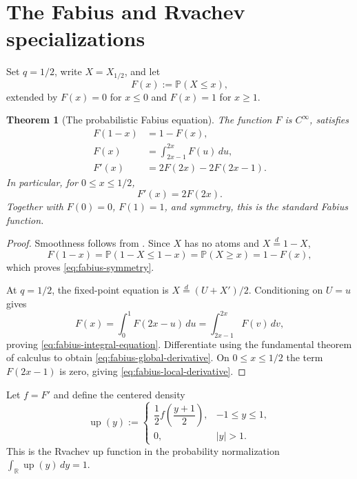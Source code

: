 \documentclass[11pt,oneside,openany]{book}
\newtheorem{theorem}{Theorem}[chapter]
\theoremstyle{definition}
\theoremstyle{remark}
\newcommand{\R}{\mathbb R}
\newcommand{\abs}[1]{\lvert #1\rvert}
\begin{document}
\section{The Fabius and Rvachev specializations}

Set $q=1/2$, write $X=X_{1/2}$, and let
\[
 F(x):=\mathbb P(X\le x),
\]
extended by $F(x)=0$ for $x\le0$ and $F(x)=1$ for $x\ge1$.

\begin{theorem}[The probabilistic Fabius equation]\label{thm:probabilistic-fabius}
The function $F$ is $C^\infty$, satisfies
\begin{align}
 F(1-x)&=1-F(x),\label{eq:fabius-symmetry}\\
 F(x)&=\int_{2x-1}^{2x}F(u)\,du,\label{eq:fabius-integral-equation}\\
 F'(x)&=2F(2x)-2F(2x-1).\label{eq:fabius-global-derivative}
\end{align}
In particular, for $0\le x\le1/2$,
\begin{equation}\label{eq:fabius-local-derivative}
 F'(x)=2F(2x).
\end{equation}
Together with $F(0)=0$, $F(1)=1$, and symmetry, this is the standard Fabius function.
\end{theorem}

\begin{proof}
Smoothness follows from .  Since $X$ has no atoms and $X\overset d=1-X$,
\[
 F(1-x)=\mathbb P(1-X\le1-x)
 =\mathbb P(X\ge x)=1-F(x),
\]
which proves \eqref{eq:fabius-symmetry}.

At $q=1/2$, the fixed-point equation is
$X\overset d=(U+X')/2$.  Conditioning on $U=u$ gives
\[
 F(x)=\int_0^1F(2x-u)\,du
 =\int_{2x-1}^{2x}F(v)\,dv,
\]
proving \eqref{eq:fabius-integral-equation}.  Differentiate using the fundamental theorem of calculus to obtain
\eqref{eq:fabius-global-derivative}.  On $0\le x\le1/2$ the term $F(2x-1)$ is zero, giving \eqref{eq:fabius-local-derivative}.
\end{proof}

Let $f=F'$ and define the centered density
\begin{equation}\label{eq:up-definition}
 \operatorname{up}(y):=
 \begin{cases}
  \dfrac12 f\!\left(\dfrac{y+1}{2}\right),&-1\le y\le1,\\[6pt]
  0,&\abs y>1.
 \end{cases}
\end{equation}
This is the Rvachev up function in the probability normalization
$\int_{\R}\operatorname{up}(y)\,dy=1$.
\end{document}
